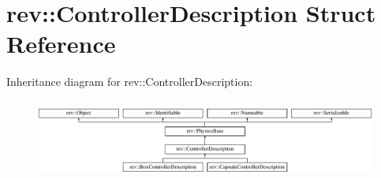 \hypertarget{classrev_1_1_controller_description}{}\section{rev\+::Controller\+Description Struct Reference}
\label{classrev_1_1_controller_description}
Inheritance diagram for rev\+::Controller\+Description\+:\begin{figure}[H]
\begin{center}
\leavevmode
\includegraphics[height=2.654028cm]{classrev_1_1_controller_description}
\end{center}
\end{figure}
